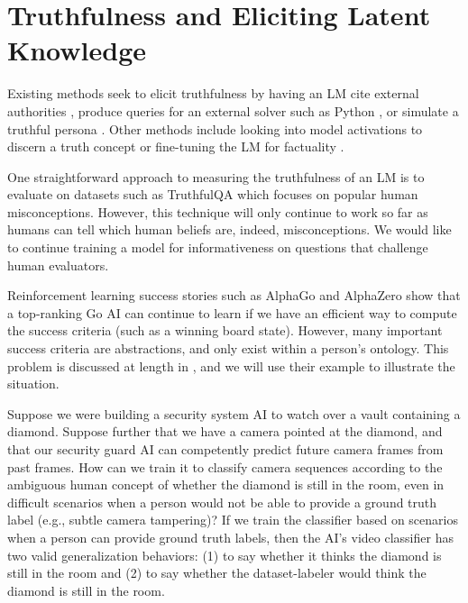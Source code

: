 \documentclass{article} %
\begin{document}
\section{Truthfulness and Eliciting Latent Knowledge}
\label{app:truth}

Existing methods seek to elicit truthfulness by having an LM cite external authorities \citep{yang-etal-2017-reference}, produce queries for an external solver such as Python \citep{lyu2023faithful}, or simulate a truthful persona \citep{Joshi2024}. Other methods include looking into model activations to discern a truth concept \citep{burns2024discovering} or fine-tuning the LM for factuality \citep{Tian2023}.

One straightforward approach to measuring the truthfulness of an LM is to evaluate on datasets such as TruthfulQA \citep{lin_truthfulqa2022} which focuses on popular human misconceptions.
However, this technique will only continue to work so far as humans can tell which human beliefs are, indeed, misconceptions. 
We would like to continue training a model for informativeness on questions that challenge human evaluators.

Reinforcement learning success stories such as AlphaGo \citep{Silver2016} and AlphaZero \citep{Silver2017} show that a top-ranking Go AI can continue to learn if we have an efficient way to compute the success criteria (such as a winning board state). However, many important success criteria are abstractions, and only exist within a person's ontology. This problem is discussed at length in \citet{christiano2021eliciting}, and we will use their example to illustrate the situation. 

Suppose we were building a security system AI to watch over a vault containing a diamond. Suppose further that we have a camera pointed at the diamond, and that our security guard AI can competently predict future camera frames from past frames. How can we train it to classify camera sequences according to the ambiguous human concept of whether the diamond is still in the room, even in difficult scenarios when a person would not be able to provide a ground truth label (e.g., subtle camera tampering)? If we train the classifier based on scenarios when a person can provide ground truth labels, then the AI's video classifier has two valid generalization behaviors: (1) to say whether it thinks the diamond is still in the room and (2) to say whether the dataset-labeler would think the diamond is still in the room. 
\end{document}
